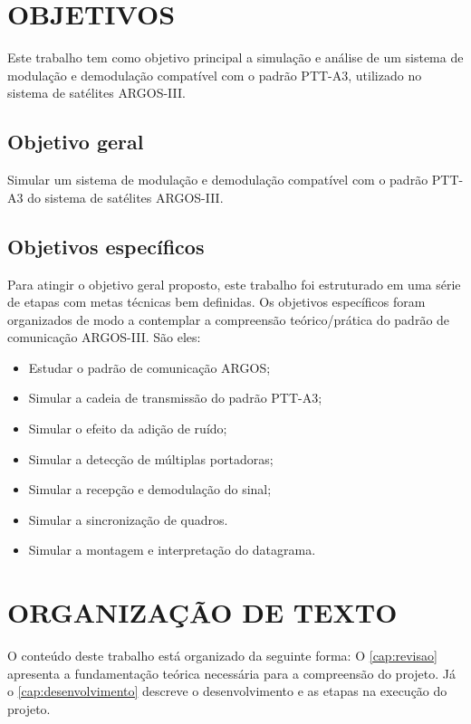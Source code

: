 \section{OBJETIVOS}\label{cap:objetivos}

Este trabalho tem como objetivo principal a simulação e análise de um sistema de modulação e demodulação compatível com o padrão \gls{PTT-A3}, utilizado no sistema de satélites \gls{ARGOS-III}. 

\subsection{Objetivo geral}

Simular um sistema de modulação e demodulação compatível com o padrão \gls{PTT-A3} do sistema de satélites \gls{ARGOS-III}.

\subsection{Objetivos específicos}

Para atingir o objetivo geral proposto, este trabalho foi estruturado em uma série de etapas com metas técnicas bem definidas. Os objetivos específicos foram organizados de modo a contemplar a compreensão teórico/prática do padrão de comunicação \gls{ARGOS-III}. São eles:

\begin{itemize}
   \item Estudar o padrão de comunicação ARGOS; 
   \item Simular a cadeia de transmissão do padrão \gls{PTT-A3}; 
   \item Simular o efeito da adição de ruído;
   \item Simular a detecção de múltiplas portadoras;
   \item Simular a recepção e demodulação do sinal; 
   \item Simular a sincronização de quadros.
   \item Simular a montagem e interpretação do datagrama.
\end{itemize}


\section{ORGANIZAÇÃO DE TEXTO}

O conteúdo deste trabalho está organizado da seguinte forma: O  \autoref{cap:revisao} apresenta a fundamentação teórica necessária para a compreensão do projeto. Já o \autoref{cap:desenvolvimento} descreve o desenvolvimento e as etapas na execução do projeto.
